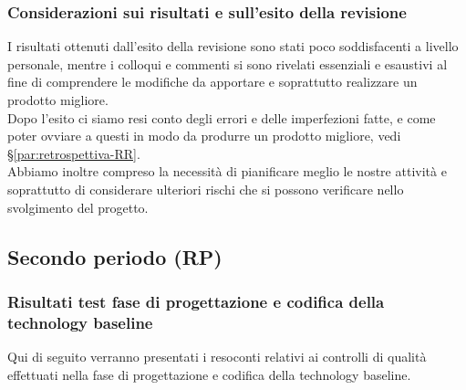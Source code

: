 \documentclass[../piano_di_qualifica.tex]{subfiles}
\begin{document}
\subsubsection{Considerazioni sui risultati e sull’esito della revisione}
I risultati ottenuti dall’esito della revisione sono stati poco soddisfacenti a livello personale, mentre i colloqui e commenti si sono rivelati essenziali e esaustivi al fine di comprendere le modifiche da apportare e soprattutto realizzare un prodotto migliore. \\
Dopo l'esito ci siamo resi conto degli errori e delle imperfezioni fatte, e come poter ovviare a questi in modo da produrre un prodotto migliore, vedi \S\ref{par:retrospettiva-RR}. \\
Abbiamo inoltre compreso la necessità di pianificare meglio le nostre attività e soprattutto di considerare ulteriori rischi che si possono verificare nello svolgimento del progetto.


\subsection{Secondo periodo (RP)}
\label{sub:periodo-RP}
\subsubsection{Risultati test fase di progettazione e codifica della technology baseline}
Qui di seguito verranno presentati i resoconti relativi ai controlli di qualità effettuati nella fase di progettazione e codifica della technology baseline. 
\end{document}
